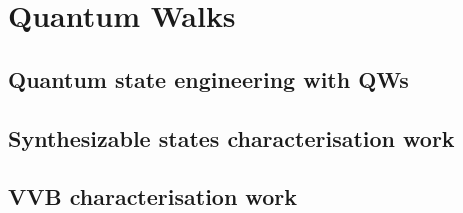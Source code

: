 
\chapter{Quantum Walks}
\label{sec:quantum_walks}

\section{Quantum state engineering with QWs}
\section{Synthesizable states characterisation work}
\section{VVB characterisation work}


\label{Section:ChapAbbr:Introduction}

